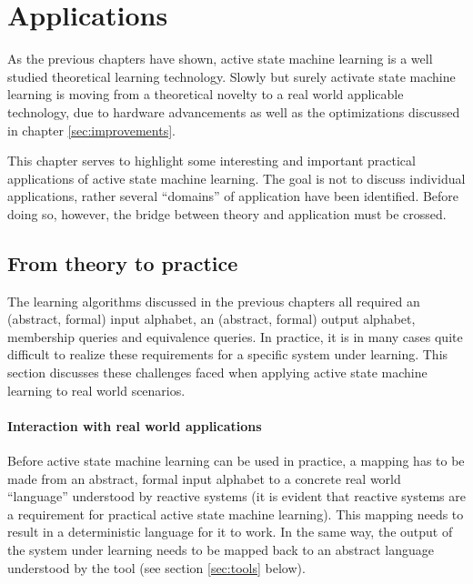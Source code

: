 \documentclass[multi,crop=false,class=article]{standalone}
\begin{document}
\section{Applications}
\label{sec:applications}

As the previous chapters have shown, active state machine learning is a well
studied theoretical learning technology. Slowly but surely activate state
machine learning is moving from a theoretical novelty to a real world applicable
technology, due to hardware advancements as well as the optimizations discussed
in chapter \cref{sec:improvements}.

This chapter serves to highlight some interesting and important practical
applications of active state machine learning. The goal is not to discuss
individual applications, rather several ``domains'' of application have been
identified. Before doing so, however, the bridge between theory and application
must be crossed.

\subsection{From theory to practice}
\label{ssec:theory-to-practice}

The learning algorithms discussed in the previous chapters all required an
(abstract, formal) input alphabet, an (abstract, formal) output alphabet,
membership queries and equivalence queries. In practice, it is in many cases
quite difficult to realize these requirements for a specific system under
learning\cite{Stefen11a}. This section discusses these challenges faced when
applying active state machine learning to real world scenarios.

\paragraph{Interaction with real world applications} Before active state machine
learning can be used in practice, a mapping has to be made from an abstract,
formal input alphabet to a concrete real world ``language'' understood by
reactive systems (it is evident that reactive systems are a requirement for
practical active state machine learning). This mapping needs to result in a deterministic language for it to
work\cite{Steffen11a}. In the same way, the output of the system under learning
needs to be mapped back to an abstract language understood by the tool (see
section \cref{sec:tools} below).
\end{document}
